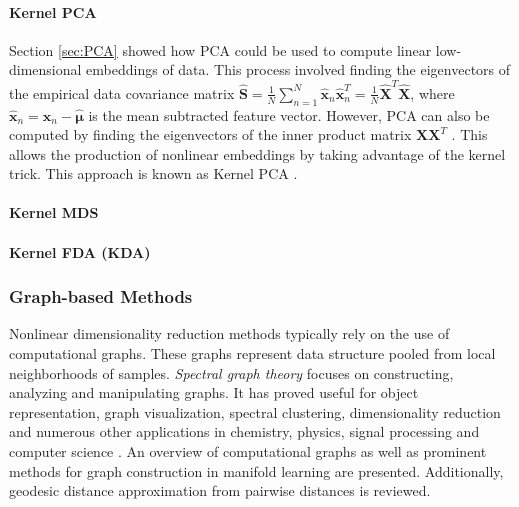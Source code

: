 \paragraph{Kernel PCA}
Section \ref{sec:PCA} showed how PCA could be used to compute linear low-dimensional embeddings of data.  This process involved finding the eigenvectors of the empirical data covariance matrix $\hat{\bm{S}} = \frac{1}{N}\sum_{n=1}^{N}\hat{\bm{x}}_{n}\hat{\bm{x}}_{n}^{T} = \frac{1}{N}\hat{\bm{X}}^{T}\hat{\bm{X}}$, where $\hat{\bm{x}}_{n} = \bm{x}_{n} - \hat{\bm{\mu}}$ is the mean subtracted feature vector.  However, PCA can also be computed by finding the eigenvectors of the inner product matrix $\bm{X}\bm{X}^{T}$ \citep{Murphy2012,Wang2014KPCAReview}.  This allows the production of nonlinear embeddings by taking advantage of the kernel trick.  This approach is known as Kernel PCA \citep{Scholkopf1999KPCA}. 

\paragraph{Kernel MDS}
\citep{Webb2002KMDS}

\paragraph{Kernel FDA (KDA)}
\citep{Ghojogh2019KDATutorial}

\subsubsection{Graph-based Methods}
Nonlinear dimensionality reduction methods typically rely on the use of computational graphs.  These graphs represent data structure pooled from local neighborhoods of samples.  \textit{Spectral graph theory} focuses on constructing, analyzing and manipulating graphs.  It has proved useful for object representation, graph visualization, spectral clustering, dimensionality reduction and numerous other applications in chemistry, physics, signal processing and computer science \citep{Shuman2013SignalProcessingGraphs, Bengoetxea2002ThesisGraphMatching}.   An overview of computational graphs as well as prominent methods for graph construction in manifold learning are presented. Additionally, geodesic distance approximation from pairwise distances is reviewed.

